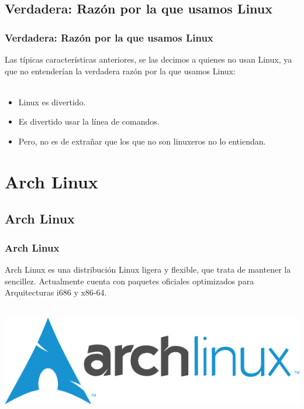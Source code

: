 \documentclass[9pt,t]{beamer}
\begin{document}
\subsection{Verdadera: Razón por la que usamos Linux}
\begin{frame}\justifying
  \frametitle{Verdadera: Razón por la que usamos Linux}
  
  Las típicas características anteriores, se las decimos a quienes no usan Linux, ya que no entenderían la verdadera razón por la que usamos Linux:
  \ \\ \ \\
  \begin{block}{}
   \begin{itemize}\justifying
      \item Linux es divertido.
      \item Es divertido usar la línea de comandos.
      \item Pero, no es de extrañar que los que no son linuxeros no lo entiendan.
   \end{itemize}
  \end{block}
\end{frame}



\section{Arch Linux}

\subsection{Arch Linux}
\begin{frame}\justifying
  \frametitle{Arch Linux}
  
	Arch Linux es una distribución Linux ligera y flexible, que trata de mantener la sencillez. 
	Actualmente cuenta con paquetes oficiales optimizados para Arquitecturas i686 y x86-64.
	\ \\ \ \\
	\begin{center}
      \includegraphics[height=0.18\textheight]{images/01_archlinux_logo.png} \hspace*{0.0cm}
    \end{center}
\end{frame}
\end{document}
